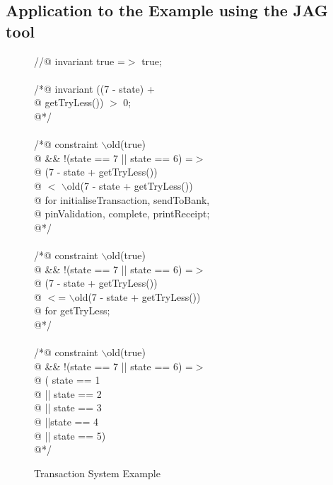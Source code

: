 


\subsection{Application to the Example using the \textsf{JAG} tool}


\begin{figure}

\begin{multicols}{2}
\begin{scriptsize}
\ttfamily
            
//@ invariant true =$>$ true;\\
\\
/*@ invariant ((7 - state) + \\
\quad @ \quad getTryLess()) $>$ 0;\\
\quad @*/\\
\\
/*@ constraint $\backslash$old(true) \\
\quad @ \quad \&\& !(state == 7 || state == 6) =$>$ \\
\quad @ (7 - state + getTryLess()) \\
\quad @ \quad $<$ $\backslash$old(7 - state + getTryLess())\\
\quad @ for initialiseTransaction, sendToBank, \\
\quad @ pinValidation, complete,   printReceipt;\\
\quad @*/ \\ 
\\
/*@ constraint $\backslash$old(true) \\
\quad @ \quad \&\& !(state == 7 || state == 6) =$>$ \\
\quad @ (7 - state + getTryLess()) \\
\quad @ \quad $<$= $\backslash$old(7 - state + getTryLess())\\
\quad @ for getTryLess;\\
\quad @*/ \\ 
\\
/*@ constraint $\backslash$old(true) \\
\quad @ \quad \&\& !(state == 7 || state == 6) =$>$ \\
\quad @ ( state == 1\\
\quad @ || state == 2\\
\quad @ || state == 3\\
\quad @ ||state == 4\\
\quad @ || state == 5)\\
\quad @*/ \\ 

\normalfont
\setlength{\parindent}{1cm}
\end{scriptsize}
\end{multicols}
\caption{Transaction System Example}
\label{FigOutExample}


\end{figure}





